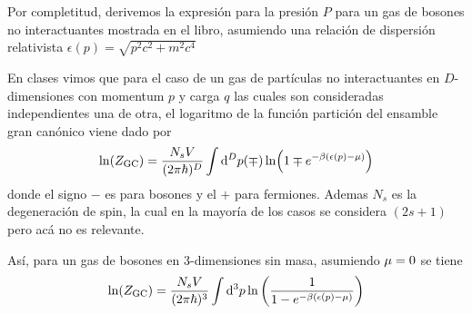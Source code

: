 \begin{sol}
Por completitud, derivemos la expresión para la presión $P$ para un gas de bosones no interactuantes mostrada en el libro, asumiendo una relación de dispersión relativista $\epsilon(p)=\sqrt{p^2c^2+m^2c^4}$

En clases vimos que para el caso de un gas de partículas no interactuantes en $D$-dimensiones con momentum $p$ y carga $q$ las cuales son consideradas independientes una de otra, el logaritmo de la función partición del ensamble gran canónico viene dado por
\begin{equation}\label{zgc pm}
  \ln(Z_{\rm GC})=\frac{N_sV}{(2\pi\hbar)^D}\int\dd^Dp(\mp )\ln(1\mp e^{-\beta (\epsilon(p)-\mu )})
\end{equation}
donde el signo $-$ es para bosones y el $+$ para fermiones. Ademas $N_s$ es la degeneración de spin, la cual en la mayoría de los casos se considera $(2s+1)$ pero acá no es relevante.

Así, para un gas de bosones en $3$-dimensiones sin masa, asumiendo $\mu=0$ se tiene
\begin{equation}
    \ln(Z_{\rm GC})=\frac{N_sV}{(2\pi\hbar)^3}\int\dd^3p\ln\left(\frac{1}{1-e^{-\beta(\epsilon(p)-\mu )}}\right)
\end{equation}



\end{sol}

